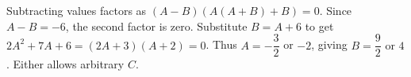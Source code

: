 Subtracting values factors as $(A-B)(A(A+B)+B)=0 $. Since $ A-B=-6 $, the second factor is zero. Substitute $ B=A+6 $ to get $ 2A^2+7A+6=(2A+3)(A+2)=0 $. Thus $ A=-\dfrac{3}{2}$ or $-2 $, giving $\boxed{B=\dfrac{9}{2}\text{ or }4}$. Either allows arbitrary $ C $.
